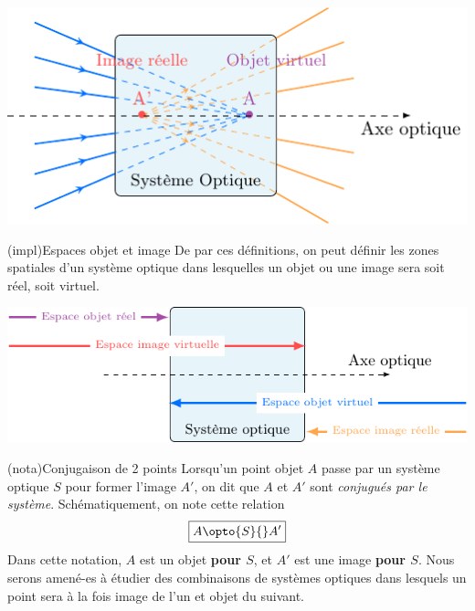 \documentclass[../../main/main.tex]{subfiles}
\begin{document}
\begin{tcb}[label=exem:rellvirt]
\begin{minipage}{0.45\linewidth}
\begin{center}
			\label{fig:objvimgr}
		\end{center}
	\end{minipage}
	\hfill
	\begin{minipage}{0.45\linewidth}
		\begin{center}
			\includegraphics[width=\linewidth]{obj_v-img_v.pdf}
			\label{fig:objvimgv}
		\end{center}
	\end{minipage}
\end{tcb}

\begin{tcb}[%
		label=impl:objimg_espace,
		sidebyside,
		righthand width=.7\textwidth](impl){Espaces objet et image}
	De par ces définitions, on peut définir les zones spatiales d'un système
	optique dans lesquelles un objet ou une image sera soit réel, soit virtuel.
	\tcblower
	\begin{center}
		\includegraphics[width=\linewidth]{objimg_espace.pdf}
		\label{fig:objimg_espace}
	\end{center}
\end{tcb}

\begin{tcb}[label=nota_opt](nota){Conjugaison de 2 points}
	Lorsqu'un point objet $A$ passe par un système optique $S$ pour former
	l'image $A'$, on dit que $A$ et $A'$ sont \textit{conjugués par le système}.
	Schématiquement, on note cette relation
	\[\boxed{A\opto{S}{}A'}\]
	Dans cette notation, $A$ est un objet \textbf{pour $S$}, et $A'$ est une
	image \textbf{pour $S$}. Nous serons amené-es à étudier des combinaisons de
	systèmes optiques dans lesquels un point sera à la fois image de l'un et
	objet du suivant.
\end{tcb}
\end{document}
